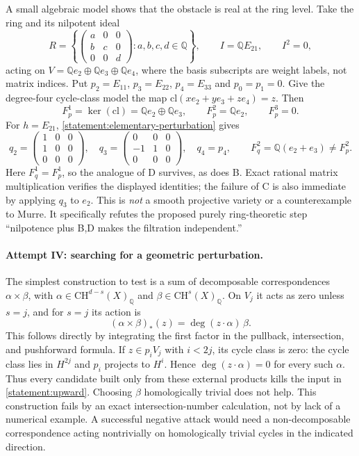 \documentclass[11pt]{article}
\newcommand{\Q}{\mathbb{Q}}
\begin{document}
A small algebraic model shows that the obstacle is real at the ring level.
Take the ring and its nilpotent ideal
\[
 R=\left\{\begin{pmatrix}a&0&0\\ b&c&0\\0&0&d\end{pmatrix}:a,b,c,d\in\Q\right\},
 \qquad I=\Q E_{21},\qquad I^2=0,
\]
acting on $V=\Q e_2\oplus\Q e_3\oplus\Q e_4$, where the basis subscripts are
weight labels, not matrix indices.  Put $p_2=E_{11}$, $p_3=E_{22}$,
$p_4=E_{33}$ and $p_0=p_1=0$.  Give the degree-four cycle-class model the map
$\mathrm{cl}(x e_2+y e_3+z e_4)=z$.  Then
\[
 F_p^1=\ker(\mathrm{cl})=\Q e_2\oplus\Q e_3,
 \qquad F_p^2=\Q e_2,
 \qquad F_p^3=0.
\]
For $h=E_{21}$, \eqref{statement:elementary-perturbation} gives
\[
 q_2=\begin{pmatrix}1&0&0\\1&0&0\\0&0&0\end{pmatrix},\quad
 q_3=\begin{pmatrix}0&0&0\\-1&1&0\\0&0&0\end{pmatrix},\quad q_4=p_4,
 \qquad F_q^2=\Q(e_2+e_3)\ne F_p^2.
\]
Here $F_q^1=F_p^1$, so the analogue of D survives, as does B.  Exact rational
matrix multiplication verifies the displayed identities; the failure of C
is also immediate by applying $q_3$ to $e_2$.
This is \emph{not} a smooth projective variety or a counterexample to Murre.
It specifically refutes the proposed purely ring-theoretic step
``nilpotence plus B,D makes the filtration independent.''

\paragraph{Attempt IV: searching for a geometric perturbation.}
The simplest construction to test is a sum of decomposable correspondences
$\alpha\times\beta$, with
$\alpha\in\mathrm{CH}^{d-s}(X)_{\Q}$ and
$\beta\in\mathrm{CH}^{s}(X)_{\Q}$.  On $V_j$ it acts as zero unless $s=j$,
and for $s=j$ its action is
\begin{equation}\label{statement:rank-one}
 (\alpha\times\beta)_*(z)=\deg(z\cdot\alpha)\,\beta.
\end{equation}
This follows directly by integrating the first factor in the pullback,
intersection, and pushforward formula.  If $z\in p_iV_j$ with $i<2j$, its
cycle class is zero: the cycle class lies in $H^{2j}$ and $p_i$ projects to
$H^i$.  Hence $\deg(z\cdot\alpha)=0$ for every such $\alpha$.  Thus every
candidate built only from these external products kills the input in
\eqref{statement:upward}.  Choosing $\beta$ homologically trivial does not help.
This construction fails by an exact intersection-number calculation, not by
lack of a numerical example.  A successful negative attack would need a
non-decomposable correspondence acting nontrivially on homologically trivial
cycles in the indicated direction.
\end{document}
